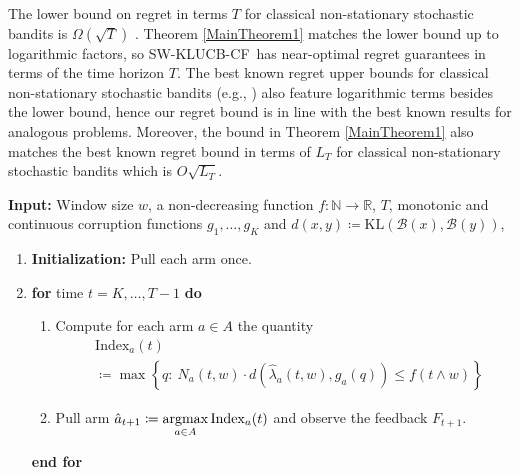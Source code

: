 \documentclass[letterpaper]{article} %
\newcommand{\ArmAt}{\hat{a}}
\newcommand{\defined}{\coloneqq}
\newcommand{\SWKLUCBCF}{\textsc{SW-KLUCB-CF}}
\newcommand{\cB}{\mathcal{B}}
\newcommand{\numChanges}{L}
\newcommand{\windowsize}{w}
\begin{document}
The lower bound on regret in terms $T$ for classical non-stationary stochastic bandits is $\Omega(\sqrt{T})$ \citep{GarivierSW}. Theorem \ref{MainTheorem1} matches the lower bound up to logarithmic factors, so \SWKLUCBCF \ has near-optimal regret guarantees in terms of the time horizon $T$. The best known regret upper bounds for classical non-stationary stochastic bandits (e.g., \citet{pmlr-v99-auer19a}) also feature logarithmic terms besides the lower bound, hence our regret bound is in line with the best known results for analogous problems.
Moreover, the bound in Theorem \ref{MainTheorem1} also matches the best known regret bound in terms of $\numChanges_T$ for classical non-stationary stochastic bandits which is $O\sqrt{\numChanges_T}$. 

\begin{algorithm}[t]
{\caption{Sliding Window KLUCB \ for Non-Stationary Stochastic Corrupt Bandits  (\SWKLUCBCF)}}%
\label{algo:SWKLUCBCF}%
{
\begin{flushleft}
\textbf{Input:} 
Window size $\windowsize$,
a non-decreasing function $f:\mathds{N} \rightarrow \mathds{R}$, $T$,  monotonic and continuous corruption functions $g_1, \dots, g_K$ and $d(x,y) \defined \mathrm{KL}(\cB(x),\cB(y))$, 
\end{flushleft}
\begin{enumerate}
\item \textbf{Initialization:} Pull each arm once.
\item \textbf{for} time $t = K, \dots, T-1$ \textbf{do}
\begin{enumerate}
\item Compute for each arm $a \in A$ the quantity
\begin{align*}
    &
    \mathrm{Index}_a(t) \\
    & \defined  \max 
\left\{ q:\  N_a(t, \windowsize)\cdot{}d(\hat{\lambda}_a(t, \windowsize ), g_a(q)) \leq f\left( t \wedge \windowsize\right)\right\}
\end{align*}
\item Pull arm $\ArmAt_{t+1} \defined \operatornamewithlimits{argmax}\limits_{a \in A} {\operatorname{Index}_a(t)}$ and observe the feedback $F_{t+1}$.
\end{enumerate}
\textbf{end for}
\end{enumerate}
}
\end{algorithm}
\end{document}
